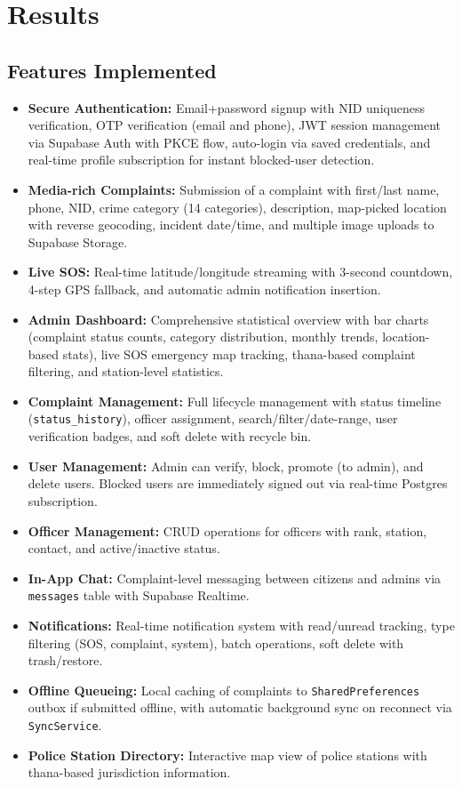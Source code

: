 \documentclass[12pt, a4paper, twoside, openany]{report}
\begin{document}
\chapter{Results}
\section{Features Implemented}
\begin{itemize}[label={}, itemsep=1em]
    \item \textbf{Secure Authentication:} Email+password signup with NID uniqueness verification, OTP verification (email and phone), JWT session management via Supabase Auth with PKCE flow, auto-login via saved credentials, and real-time profile subscription for instant blocked-user detection.
    \item \textbf{Media-rich Complaints:} Submission of a complaint with first/last name, phone, NID, crime category (14 categories), description, map-picked location with reverse geocoding, incident date/time, and multiple image uploads to Supabase Storage.
    \item \textbf{Live SOS:} Real-time latitude/longitude streaming with 3-second countdown, 4-step GPS fallback, and automatic admin notification insertion.
    \item \textbf{Admin Dashboard:} Comprehensive statistical overview with bar charts (complaint status counts, category distribution, monthly trends, location-based stats), live SOS emergency map tracking, thana-based complaint filtering, and station-level statistics.
    \item \textbf{Complaint Management:} Full lifecycle management with status timeline (\texttt{status\_history}), officer assignment, search/filter/date-range, user verification badges, and soft delete with recycle bin.
    \item \textbf{User Management:} Admin can verify, block, promote (to admin), and delete users. Blocked users are immediately signed out via real-time Postgres subscription.
    \item \textbf{Officer Management:} CRUD operations for officers with rank, station, contact, and active/inactive status.
    \item \textbf{In-App Chat:} Complaint-level messaging between citizens and admins via \texttt{messages} table with Supabase Realtime.
    \item \textbf{Notifications:} Real-time notification system with read/unread tracking, type filtering (SOS, complaint, system), batch operations, soft delete with trash/restore.
    \item \textbf{Offline Queueing:} Local caching of complaints to \texttt{SharedPreferences} outbox if submitted offline, with automatic background sync on reconnect via \texttt{SyncService}.
    \item \textbf{Police Station Directory:} Interactive map view of police stations with thana-based jurisdiction information.
\end{itemize}
\end{document}
